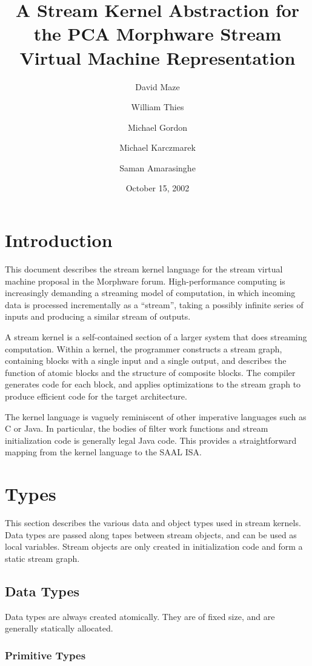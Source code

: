 \documentclass[11pt]{article}
\title{A Stream Kernel Abstraction for the PCA Morphware Stream
  Virtual Machine Representation}
\author{David Maze \and William Thies \and Michael Gordon \and Michael
  Karczmarek \and Saman Amarasinghe}
\date{October 15, 2002}
\begin{document}
\maketitle
\tableofcontents

\section{Introduction}

This document describes the stream kernel language for the stream
virtual machine proposal in the Morphware forum.  High-performance
computing is increasingly demanding a streaming model of computation,
in which incoming data is processed incrementally as a ``stream'',
taking a possibly infinite series of inputs and producing a similar
stream of outputs.

A stream kernel is a self-contained section of a larger system that
does streaming computation.  Within a kernel, the programmer
constructs a stream graph, containing blocks with a single input and a
single output, and describes the function of atomic blocks and the
structure of composite blocks.  The compiler generates code for each
block, and applies optimizations to the stream graph to produce
efficient code for the target architecture.

The kernel language is vaguely reminiscent of other imperative
languages such as C or Java.  In particular, the bodies of filter work
functions and stream initialization code is generally legal Java
code.  This provides a straightforward mapping from the kernel
language to the SAAL ISA.

\section{Types}

This section describes the various data and object types used in
stream kernels.  Data types are passed along tapes between stream
objects, and can be used as local variables.  Stream objects are only
created in initialization code and form a static stream graph.

\subsection{Data Types}

Data types are always created atomically.  They are of fixed size, and
are generally statically allocated.

\subsubsection{Primitive Types}
\end{document}
